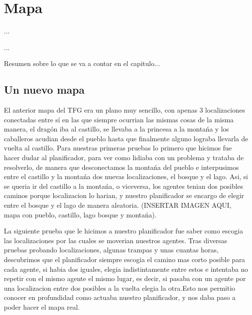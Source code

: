 %
%

\chapter{Mapa}

\begin{FraseCelebre}
\begin{Frase}
...
\end{Frase}
\begin{Fuente}
...
\end{Fuente}
\end{FraseCelebre}

\begin{resumen}
Resumen sobre lo que se va a contar en el capitulo...
\end{resumen}


\section{Un nuevo mapa}
\label{cap21:sec:objetivos}

El anterior mapa del TFG era un plano muy sencillo, con apenas 3 localizaciones conectadas entre s\'i en las que siempre ocurrian las mismas cosas de la misma manera, el drag\'on iba al castillo, se llevaba a la princesa a la monta\'na y los caballeros acudian desde el pueblo hasta que finalmente alguno lograba llevarla de vuelta al castillo. 
Para nuestras primeras pruebas lo primero que hicimos fue hacer dudar al planificador, para ver como lidiaba con un problema y trataba de resolverlo, de manera que desconectamos la monta\'na del pueblo e interpusimos entre el castillo y la monta\'na dos nuevas localizaciones, el bosque y el lago. Asi, si se queria ir del castillo a la monta\'na, o viceversa, los agentes tenian dos posibles caminos porque localizacion lo harian, y nuestro planificador se encargo de elegir entre el bosque y el lago de manera aleatoria.
(INSERTAR IMAGEN AQUI, mapa con pueblo, castillo, lago bosque y monta\'na).

La siguiente prueba que le hicimos a nuestro planificador fue saber como escogia las localizaciones por las cuales se moverian nuestros agentes. Tras diversas pruebas probando localizaciones, algunas trampas y unas cuantas horas, descubrimos que el planificador siempre escogia el camino mas corto posible para cada agente, si habia dos iguales, elegia indistintamente entre estos e intentaba no repetir con el mismo agente el mismo lugar, es decir, si pasaba con un agente por una localizacion entre dos posibles a la vuelta elegia la otra.Esto nos permitio conocer en profundidad como actuaba nuestro planificador, y nos daba paso a poder hacer el mapa real.

